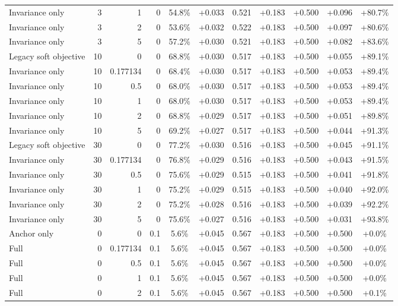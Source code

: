 \begin{table}[htbp]
\begin{tabular}{lrrrccccccc}
Invariance only & 3 & 1 & 0 & 54.8\% & +0.033 & 0.521 & +0.183 & +0.500 & +0.096 & +80.7\% \\
Invariance only & 3 & 2 & 0 & 53.6\% & +0.032 & 0.522 & +0.183 & +0.500 & +0.097 & +80.6\% \\
Invariance only & 3 & 5 & 0 & 57.2\% & +0.030 & 0.521 & +0.183 & +0.500 & +0.082 & +83.6\% \\
Legacy soft objective & 10 & 0 & 0 & 68.8\% & +0.030 & 0.517 & +0.183 & +0.500 & +0.055 & +89.1\% \\
Invariance only & 10 & 0.177134 & 0 & 68.4\% & +0.030 & 0.517 & +0.183 & +0.500 & +0.053 & +89.4\% \\
Invariance only & 10 & 0.5 & 0 & 68.0\% & +0.030 & 0.517 & +0.183 & +0.500 & +0.053 & +89.4\% \\
Invariance only & 10 & 1 & 0 & 68.0\% & +0.030 & 0.517 & +0.183 & +0.500 & +0.053 & +89.4\% \\
Invariance only & 10 & 2 & 0 & 68.8\% & +0.029 & 0.517 & +0.183 & +0.500 & +0.051 & +89.8\% \\
Invariance only & 10 & 5 & 0 & 69.2\% & +0.027 & 0.517 & +0.183 & +0.500 & +0.044 & +91.3\% \\
Legacy soft objective & 30 & 0 & 0 & 77.2\% & +0.030 & 0.516 & +0.183 & +0.500 & +0.045 & +91.1\% \\
Invariance only & 30 & 0.177134 & 0 & 76.8\% & +0.029 & 0.516 & +0.183 & +0.500 & +0.043 & +91.5\% \\
Invariance only & 30 & 0.5 & 0 & 75.6\% & +0.029 & 0.515 & +0.183 & +0.500 & +0.041 & +91.8\% \\
Invariance only & 30 & 1 & 0 & 75.2\% & +0.029 & 0.515 & +0.183 & +0.500 & +0.040 & +92.0\% \\
Invariance only & 30 & 2 & 0 & 75.2\% & +0.028 & 0.516 & +0.183 & +0.500 & +0.039 & +92.2\% \\
Invariance only & 30 & 5 & 0 & 75.6\% & +0.027 & 0.516 & +0.183 & +0.500 & +0.031 & +93.8\% \\
Anchor only & 0 & 0 & 0.1 & 5.6\% & +0.045 & 0.567 & +0.183 & +0.500 & +0.500 & +0.0\% \\
Full & 0 & 0.177134 & 0.1 & 5.6\% & +0.045 & 0.567 & +0.183 & +0.500 & +0.500 & +0.0\% \\
Full & 0 & 0.5 & 0.1 & 5.6\% & +0.045 & 0.567 & +0.183 & +0.500 & +0.500 & +0.0\% \\
Full & 0 & 1 & 0.1 & 5.6\% & +0.045 & 0.567 & +0.183 & +0.500 & +0.500 & +0.0\% \\
Full & 0 & 2 & 0.1 & 5.6\% & +0.045 & 0.567 & +0.183 & +0.500 & +0.500 & +0.1\% \\

\end{tabular}
\end{table}
